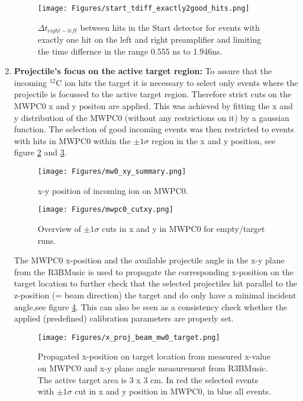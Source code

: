 \begin{enumerate}
\begin{figure}
\centering
\texttt{[image: Figures/start\_tdiff\_exactly2good\_hits.png]}
\caption{$\Delta t_{right-left}$ between hits in the Start detector for events with exactly one hit on the left and right preamplifier and limiting the time differnce in the range 0.555 ns to 1.946ns.}
\label{fig:start_good_event_sel}
\end{figure}
\item \textbf{Projectile's focus on the active target region:}\newline
To assure that the incoming $^{12}$C ion hits the target it is necessary to select only events where the projectile is focussed to the active target region. Therefore strict cuts on the MWPC0 x and y positon are applied. This was achieved by fitting the x and y distribution of the MWPC0 (without any restrictions on it) by a gaussian function. The selection of good incoming events was then restricted to events with hits in MWPC0 within the $\pm 1\sigma$ region in the x and y position, see figure \ref{fig:mw0_xy_overview} and \ref{fig:mw0_cuts}.\newline
\begin{figure}
\centering
\texttt{[image: Figures/mw0\_xy\_summary.png]}
\caption{x-y position of incoming ion on MWPC0.}
\label{fig:mw0_xy_overview}
\end{figure}
\begin{figure}
\centering
\texttt{[image: Figures/mwpc0\_cutxy.png]}
\caption{Overview of $\pm 1\sigma$ cuts in x and y in MWPC0 for empty/target runs.}
\label{fig:mw0_cuts}
\end{figure}
The MWPC0 x-position and the available projectile angle in the x-y plane from the R3BMusic is used to propagate the corresponding x-position on the target location to further check that the selected projectiles hit parallel to the z-position (= beam direction) the target and do only have a minimal incident angle,see figure \ref{fig:x_pos_target}. This can also be seen as a consistency check whether the applied (predefined) calibration parameters are properly set.
\begin{figure}[htpb]
    \centering
    \texttt{[image: Figures/x\_proj\_beam\_mw0\_target.png]}
    \caption{
   	Propagated x-position on target location from measured x-value on MWPC0 and x-y plane angle measurement from R3BMusic. The active target area is 3 x 3 cm. In red the selected events with $\pm 1\sigma$ cut in x and y position in MWPC0, in blue all events.
    }
    \label{fig:x_pos_target}
\end{figure}
\end{enumerate}
